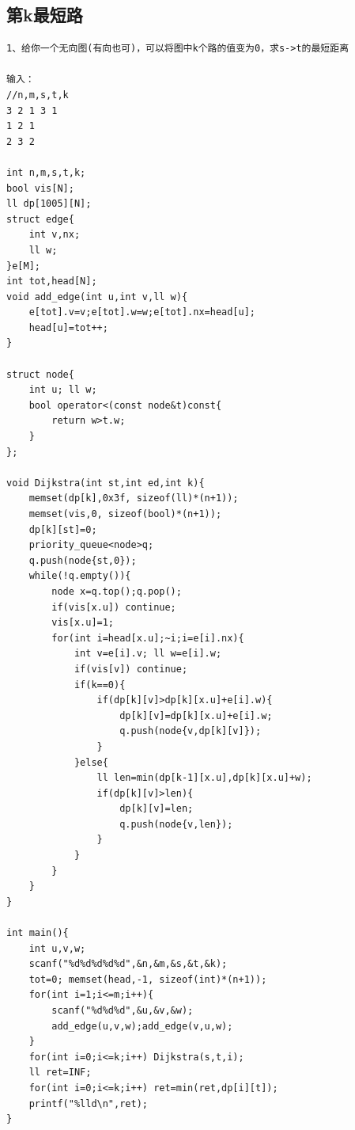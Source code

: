 \documentclass[twoside]{article}
\begin{document}
\subsection{第k最短路}
\begin{lstlisting}
1、给你一个无向图(有向也可)，可以将图中k个路的值变为0，求s->t的最短距离

输入：
//n,m,s,t,k
3 2 1 3 1
1 2 1
2 3 2

int n,m,s,t,k;
bool vis[N];
ll dp[1005][N];
struct edge{
    int v,nx;
    ll w;
}e[M];
int tot,head[N];
void add_edge(int u,int v,ll w){
    e[tot].v=v;e[tot].w=w;e[tot].nx=head[u];
    head[u]=tot++;
}

struct node{
    int u; ll w;
    bool operator<(const node&t)const{
        return w>t.w;
    }
};

void Dijkstra(int st,int ed,int k){
    memset(dp[k],0x3f, sizeof(ll)*(n+1));
    memset(vis,0, sizeof(bool)*(n+1));
    dp[k][st]=0;
    priority_queue<node>q;
    q.push(node{st,0});
    while(!q.empty()){
        node x=q.top();q.pop();
        if(vis[x.u]) continue;
        vis[x.u]=1;
        for(int i=head[x.u];~i;i=e[i].nx){
            int v=e[i].v; ll w=e[i].w;
            if(vis[v]) continue;
            if(k==0){
                if(dp[k][v]>dp[k][x.u]+e[i].w){
                    dp[k][v]=dp[k][x.u]+e[i].w;
                    q.push(node{v,dp[k][v]});
                }
            }else{
                ll len=min(dp[k-1][x.u],dp[k][x.u]+w);
                if(dp[k][v]>len){
                    dp[k][v]=len;
                    q.push(node{v,len});
                }
            }
        }
    }
}

int main(){
    int u,v,w;
    scanf("%d%d%d%d%d",&n,&m,&s,&t,&k);
    tot=0; memset(head,-1, sizeof(int)*(n+1));
    for(int i=1;i<=m;i++){
        scanf("%d%d%d",&u,&v,&w);
        add_edge(u,v,w);add_edge(v,u,w);
    }
    for(int i=0;i<=k;i++) Dijkstra(s,t,i);
    ll ret=INF;
    for(int i=0;i<=k;i++) ret=min(ret,dp[i][t]);
    printf("%lld\n",ret);
}\end{lstlisting}
\end{document}
